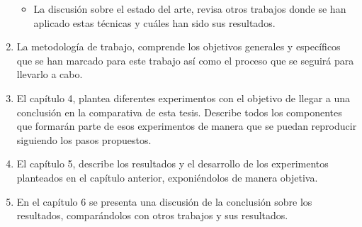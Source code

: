 \documentclass[11pt,a4paper,spanish]{book}
\begin{document}
\begin{enumerate}
\begin{itemize}
			\item La discusión sobre el estado del arte, revisa otros trabajos donde se han aplicado estas técnicas y cuáles han sido sus resultados.
		
		\end{itemize}
		
		\item La metodología de trabajo, comprende los objetivos generales y específicos que se han marcado para este trabajo así como el proceso que se seguirá para llevarlo a cabo.
		
		\item El capítulo 4, plantea diferentes experimentos con el objetivo de llegar a una conclusión en la comparativa de esta tesis. Describe  todos los componentes que formarán parte de esos experimentos de manera que se puedan reproducir siguiendo los pasos propuestos.
		
		\item El capítulo 5, describe los resultados y el desarrollo de los experimentos planteados en el capítulo anterior, exponiéndolos de manera objetiva.
		
		\item En el capítulo 6 se presenta una discusión de la conclusión sobre los resultados, comparándolos con otros trabajos y sus resultados.
		
	\end{enumerate}
	


	\printbibliography
\end{document}
